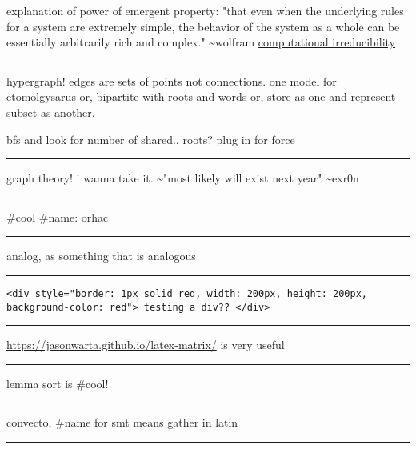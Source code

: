 \documentclass[letterpaper]{article}
\begin{document}
explanation of power of emergent property: "that even when the
underlying rules for a system are extremely simple, the behavior of the
system as a whole can be essentially arbitrarily rich and complex."
\textasciitilde{}wolfram
\href{https://www.wolframscience.com/nks/p737--computational-irreducibility/}{computational
irreducibility}

\noindent\rule{\textwidth}{0.5pt}

hypergraph! edges are sets of points not connections. one model for
etomolgysarus or, bipartite with roots and words or, store as one and
represent subset as another.

bfs and look for number of shared.. roots? plug in for force

\noindent\rule{\textwidth}{0.5pt}

graph theory! i wanna take it. \textasciitilde{}"most likely will exist next year"
\textasciitilde{}exr0n

\noindent\rule{\textwidth}{0.5pt}

\#cool \#name: orhac

\noindent\rule{\textwidth}{0.5pt}

analog, as something that is analogous

\noindent\rule{\textwidth}{0.5pt}

\begin{verbatim}
<div style="border: 1px solid red, width: 200px, height: 200px, background-color: red"> testing a div?? </div>
\end{verbatim}

\noindent\rule{\textwidth}{0.5pt}

\url{https://jasonwarta.github.io/latex-matrix/} is very useful

\noindent\rule{\textwidth}{0.5pt}

lemma sort is \#cool!

\noindent\rule{\textwidth}{0.5pt}

convecto, \#name for smt means gather in latin

\noindent\rule{\textwidth}{0.5pt}
\end{document}
